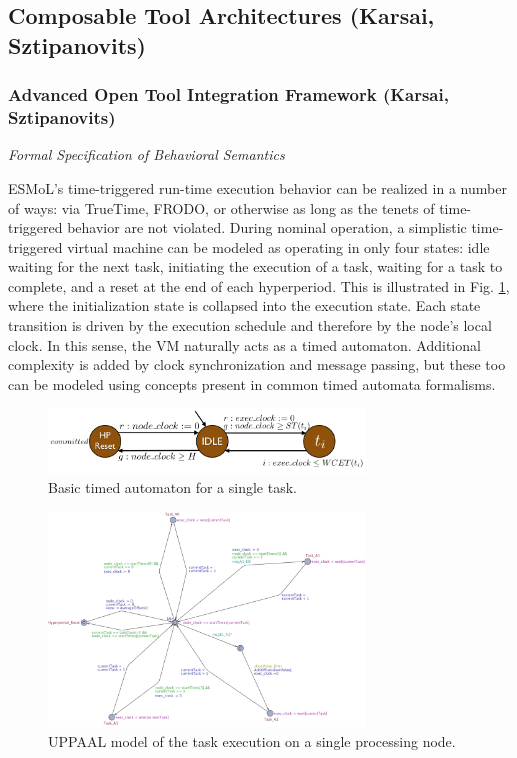 \subsection{Composable Tool Architectures (Karsai, Sztipanovits)}

\subsubsection{ Advanced Open Tool Integration Framework (Karsai, Sztipanovits)}

\emph{Formal Specification of Behavioral Semantics} 

ESMoL's time-triggered run-time execution behavior can be realized in a number of ways: via TrueTime, FRODO, or otherwise as long as the tenets of time-triggered behavior are not violated\cite{rt_thesis,gh_truetime}.  During nominal operation, a simplistic time-triggered virtual machine can be modeled as operating in only four states: idle waiting for the next task, initiating the execution of a task, waiting for a task to complete, and a reset at the end of each hyperperiod.  This is illustrated in Fig. \ref{fig:generic_TA}, where the initialization state is collapsed into the execution state.  Each state transition is driven by the execution schedule and therefore by the node's local clock.  In this sense, the VM naturally acts as a timed automaton.  Additional complexity is added by clock synchronization and message passing, but these too can be modeled using concepts present in common timed automata formalisms.

\begin{figure}[thpb]
\centering
\includegraphics[width=0.75\textwidth]{img/generic_TA.png}
\caption{Basic timed automaton for a single task.}
\label{fig:generic_TA}
\end{figure}

\begin{figure}[thpb]
\centering
\includegraphics[width=0.75\textwidth]{img/uppaal_nodeA.png}
\caption{UPPAAL model of the task execution on a single processing node.}
\label{fig:uppaal_nodeA}
\end{figure}


